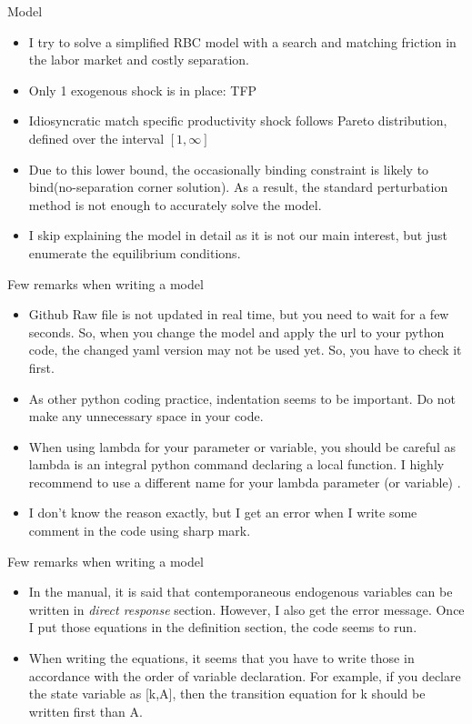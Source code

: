 \documentclass{beamer}
\begin{document}
\begin{frame}{Model}
    \begin{itemize}
        \item I try to solve a simplified RBC model with a search and matching friction in the labor market and costly separation. 
        \item Only 1 exogenous shock is in place: TFP
        \item Idiosyncratic match specific productivity shock follows Pareto distribution, defined over the interval $[1, \infty]$
        \item Due to this lower bound, the occasionally binding constraint is likely to bind(no-separation corner solution). As a result, the standard perturbation method is not enough to accurately solve the model.   
        \item I skip explaining the model in detail as it is not our main interest, but just enumerate the equilibrium conditions. 
    \end{itemize}
\end{frame}
\begin{frame}{Few remarks when writing a model}
    \begin{itemize}
        \item Github Raw file is not updated in real time, but you need to wait for a few seconds. So, when you change the model and apply the url to your python code, the changed yaml version may not be used yet. So, you have to check it first. 
        \item As other python coding practice, indentation seems to be important. Do not make any unnecessary space in your code. 
        \item When using lambda for your parameter or variable, you should be careful as lambda is an integral python command declaring a local function. I highly recommend  to use a different name for your lambda parameter (or variable) .  \item I don't know the reason exactly, but I get an error when I write some comment in the code using sharp mark. 
        
    \end{itemize}

\end{frame}
\begin{frame}{Few remarks when writing a model}
    \begin{itemize}
       \item In the manual, it is said that contemporaneous endogenous variables can be written in \textit{direct response} section. However, I also get the error message. Once I put those equations in the definition section, the code seems to run. \item When writing the equations, it seems that you have to write those in accordance with the order of variable declaration. For example, if you declare the state variable as [k,A], then the transition equation for k should be written first than A.  
    \end{itemize}
\end{frame}
\end{document}
